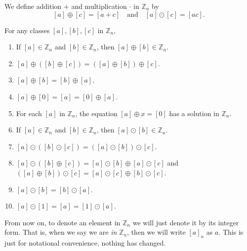 \documentclass[../main.tex]{subfiles}
\begin{document}
\begin{definition}
We define addition $+$ and multiplication $ \cdot$ in $\mathbb{Z}_n$ by 
\[
 [a] \oplus [c] = [a + c] \quad \text{and} \quad [a] \odot [c] = [ac].
\]
\end{definition}











\begin{proposition}
For any classes $[a], [b], [c]$ in $\mathbb{Z}_n$,

\begin{enumerate}
    \item If $[a] \in \mathbb{Z}_n$ and $[b] \in \mathbb{Z}_n$, then $[a] \oplus [b] \in \mathbb{Z}_n$.
    \item $[a] \oplus ([b] \oplus [c]) = ([a] \oplus [b]) \oplus [c]$.
    \item $[a] \oplus [b] = [b] \oplus [a]$.
    \item $[a] \oplus [0] = [a] = [0] \oplus [a]$.
    \item For each $[a]$ in $\mathbb{Z}_n$, the equation $[a] \oplus x = [0]$ has a solution in $\mathbb{Z}_n$.
    \item If $[a] \in \mathbb{Z}_n$ and $[b] \in \mathbb{Z}_n$, then $[a] \odot [b] \in \mathbb{Z}_n$.
    \item $[a] \odot ([b] \odot [c]) = ([a] \odot [b]) \odot [c]$.
    \item $[a] \odot ([b] \oplus [c]) = [a] \odot [b] \oplus [a] \odot [c]$ and
          \newline \hspace{0.5cm} $([a] \oplus [b]) \odot [c] = [a] \odot [c] \oplus [b] \odot [c]$.
    \item $[a] \odot [b] = [b] \odot [a]$.
    \item $[a] \odot [1] = [a] = [1] \odot [a]$.
\end{enumerate}
\end{proposition}




\begin{remark}
From now on, to denote an element in $\mathbb{Z}_n$ we will just denote it by its integer form. That is, when we say we are \textit{in} $\mathbb{Z}_n$, then we will write $[a]_n$ as $a$. This is just for notational convenience, nothing has changed. 
\end{remark}
\end{document}
